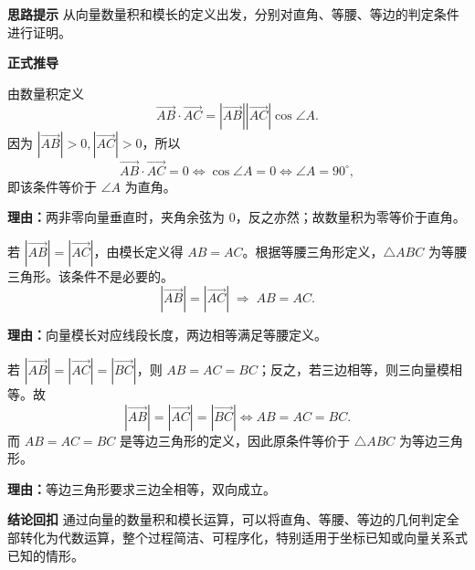 \begin{proofbox}
	\textbf{\textcolor{CProof}{思路提示}}
	从向量数量积和模长的定义出发，分别对直角、等腰、等边的判定条件进行证明。

	\medskip
	\textbf{\textcolor{CProof}{正式推导}}
	\begin{description}[style=nextline, leftmargin=2.8em, labelsep=0.5em, itemsep=0.55em]
		\item[\textbf{步骤一（直角判定）：}]
			由数量积定义
			\[
				\overrightarrow{AB}\cdot\overrightarrow{AC}=|\overrightarrow{AB}||\overrightarrow{AC}|\cos\angle A.
			\]
			因为 $|\overrightarrow{AB}|>0,|\overrightarrow{AC}|>0$，所以
			\[
				\overrightarrow{AB}\cdot\overrightarrow{AC}=0 \iff \cos\angle A=0 \iff \angle A=90^\circ,
			\]
			即该条件等价于 $\angle A$ 为直角。
			\par\textbf{理由：}两非零向量垂直时，夹角余弦为 $0$，反之亦然；故数量积为零等价于直角。
		\item[\textbf{步骤二（等腰判定）：}]
			若 $|\overrightarrow{AB}|=|\overrightarrow{AC}|$，由模长定义得 $AB=AC$。根据等腰三角形定义，$\triangle ABC$ 为等腰三角形。该条件不是必要的。
			\[
				|\overrightarrow{AB}|=|\overrightarrow{AC}| \;\Longrightarrow\; AB=AC.
			\]
			\par\textbf{理由：}向量模长对应线段长度，两边相等满足等腰定义。
		\item[\textbf{步骤三（等边判定）：}]
			若 $|\overrightarrow{AB}|=|\overrightarrow{AC}|=|\overrightarrow{BC}|$，则 $AB=AC=BC$；反之，若三边相等，则三向量模相等。故
			\[
				|\overrightarrow{AB}|=|\overrightarrow{AC}|=|\overrightarrow{BC}| \iff AB=AC=BC.
			\]
			而 $AB=AC=BC$ 是等边三角形的定义，因此原条件等价于 $\triangle ABC$ 为等边三角形。
			\par\textbf{理由：}等边三角形要求三边全相等，双向成立。
	\end{description}

	\medskip
	\textbf{\textcolor{CProof}{结论回扣}}
	通过向量的数量积和模长运算，可以将直角、等腰、等边的几何判定全部转化为代数运算，整个过程简洁、可程序化，特别适用于坐标已知或向量关系式已知的情形。
\end{proofbox}
